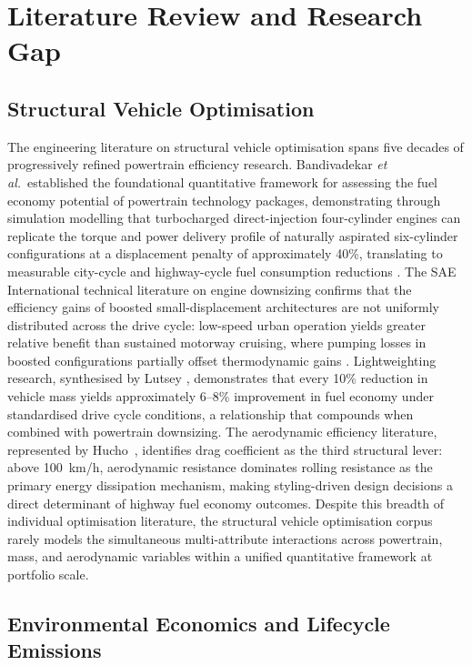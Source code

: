 \documentclass[conference]{IEEEtran}
\begin{document}
\section{Literature Review and Research Gap}

\subsection{Structural Vehicle Optimisation}

The engineering literature on structural vehicle optimisation spans five
decades of progressively refined powertrain efficiency research.
Bandivadekar \textit{et al.}\ established the foundational quantitative
framework for assessing the fuel economy potential of powertrain
technology packages, demonstrating through simulation modelling that
turbocharged direct-injection four-cylinder engines can replicate the
torque and power delivery profile of naturally aspirated six-cylinder
configurations at a displacement penalty of approximately 40\%, translating
to measurable city-cycle and highway-cycle fuel consumption reductions
\cite{bandivadekar2011beyond}. The SAE International technical literature
on engine downsizing confirms that the efficiency gains of boosted
small-displacement architectures are not uniformly distributed across
the drive cycle: low-speed urban operation yields greater relative
benefit than sustained motorway cruising, where pumping losses in
boosted configurations partially offset thermodynamic gains
\cite{sae2021downsizing}. Lightweighting research, synthesised by
Lutsey \cite{lutsey2010compounding}, demonstrates that every 10\%
reduction in vehicle mass yields approximately 6--8\% improvement in
fuel economy under standardised drive cycle conditions, a relationship
that compounds when combined with powertrain downsizing. The aerodynamic
efficiency literature, represented by Hucho~\cite{hucho1998aerodynamics},
identifies drag coefficient as the third structural lever: above
100~km/h, aerodynamic resistance dominates rolling resistance as the
primary energy dissipation mechanism, making styling-driven design
decisions a direct determinant of highway fuel economy outcomes.
Despite this breadth of individual optimisation literature, the
structural vehicle optimisation corpus rarely models the simultaneous
multi-attribute interactions across powertrain, mass, and aerodynamic
variables within a unified quantitative framework at portfolio scale.

\subsection{Environmental Economics and Lifecycle Emissions}
\end{document}
